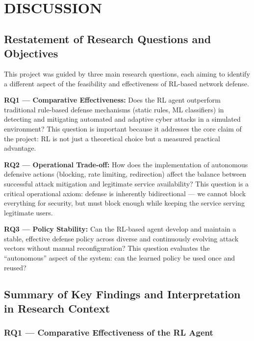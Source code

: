 \documentclass[12pt,a4paper]{report}
\begin{document}
\chapter{DISCUSSION}

\section{Restatement of Research Questions and Objectives}

This project was guided by three main research questions, each aiming to identify a different aspect of the feasibility and effectiveness of RL-based network defense.

\textbf{RQ1 --- Comparative Effectiveness:} Does the RL agent outperform traditional rule-based defense mechanisms (static rules, ML classifiers) in detecting and mitigating automated and adaptive cyber attacks in a simulated environment? This question is important because it addresses the core claim of the project: RL is not just a theoretical choice but a measured practical advantage.

\textbf{RQ2 --- Operational Trade-off:} How does the implementation of autonomous defensive actions (blocking, rate limiting, redirection) affect the balance between successful attack mitigation and legitimate service availability? This question is a critical operational axiom: defense is inherently bidirectional --- we cannot block everything for security, but must block enough while keeping the service serving legitimate users.

\textbf{RQ3 --- Policy Stability:} Can the RL-based agent develop and maintain a stable, effective defense policy across diverse and continuously evolving attack vectors without manual reconfiguration? This question evaluates the ``autonomous'' aspect of the system: can the learned policy be used once and reused?

\section{Summary of Key Findings and Interpretation in Research Context}

\subsection{RQ1 --- Comparative Effectiveness of the RL Agent}
\end{document}

